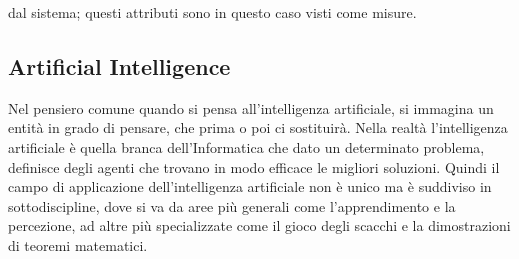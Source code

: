 \documentclass[14pt]{extarticle}
\begin{document}
dal sistema; questi attributi sono in questo caso visti come misure.

\subsection{Artificial Intelligence}
Nel pensiero comune quando si pensa all'intelligenza artificiale, si immagina un entità in grado di pensare, che prima o poi ci sostituirà. Nella realtà l'intelligenza artificiale è quella branca dell'Informatica che dato un determinato problema, definisce degli agenti che trovano in modo efficace le migliori soluzioni. Quindi il campo di  applicazione dell'intelligenza artificiale non è unico ma è suddiviso in sottodiscipline, dove si va da aree più generali come l'apprendimento e la percezione, ad altre più specializzate come il gioco degli scacchi e la dimostrazioni di teoremi matematici.
\end{document}
